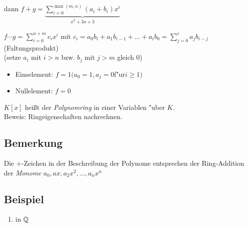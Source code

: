 dann $f + g = \underbrace{\sum_{i=0}^{\max(m,n)}(a_i+b_i)x^i}_{x^3 + 3x +3}$

$f \cdots g = \sum_{i=0}^{n+m} c_ix^i$ mit $c_i= a_0b_i+a_1b_{i-1}+ \dots + a_ib_0 = \sum_{j=0}^{i} a_jb_{i-j} $ (Faltungsprodukt)\\
(setze $a_i$ mit $i>n$ bzw. $b_j$ mit $j>m$ gleich 0)
\begin{itemize}
	\item
	Einselement: $f=1 (a_0=1, a_j = 0 $f"ur$ i\geq 1)$
	\item
	Nullelement: $f= 0$
\end{itemize}
$K[x]$ heißt der \emph{Polynomring} in einer Variablen "uber $K$.\\
Beweis: Ringeigenschaften nachrechnen.

\subsection{Bemerkung}
Die +-Zeichen in der Beschreibung der Polynome entsprechen der Ring-Addition der \emph{Monome} $a_0, ax, a_2x^2, \dots, a_nx^n$

\subsection{Beispiel}

\begin{enumerate}
	\item 
	in $\mathbb{Q}$
\end{enumerate}